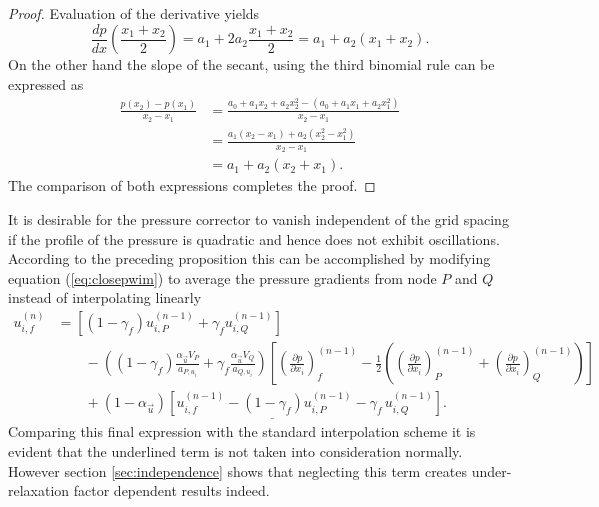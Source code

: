 \begin{proof}
  Evaluation of the derivative yields
  \begin{displaymath}
      \frac{dp}{dx}\left(\frac{x_1+x_2}{2}\right) = a_1 + 2 a_2 \frac{x_1 + x_2}{2} = a_1 + a_2(x_1 + x_2).
  \end{displaymath}
  On the other hand the slope of the secant, using the third binomial rule can be expressed as
  \begin{displaymath}
    \begin{array}{ll}
    \frac{p(x_2) - p(x_1)}{x_2 - x_1} 
  &= \frac{a_0 + a_1 x_2 + a_2 x_2^2 - \left(a_0 + a_1 x_1 + a_2 x_1 ^2\right)}{x_2 - x_1} \\[1.0em]
    \quad &= \frac{a_1 (x_2 - x_1) + a_2 \left(x_2^2 - x_1^2\right)}{x_2 - x_1} \\[1.0em]
    \quad &= a_1 + a_2 (x_2 + x_1).
  \end{array}
  \end{displaymath}
  The comparison of both expressions completes the proof.
\end{proof}
  It is desirable for the pressure corrector to vanish independent of the grid spacing if the profile of the pressure is quadratic and hence does not exhibit oscillations. According to the preceding proposition this can be accomplished by modifying equation (\ref{eq:closepwim}) to average the pressure gradients from node \(P\) and \(Q\) instead of interpolating linearly
  \begin{align}
    u_{i,f}^{(n)} 
    &=
    \left[\left(1 - \gamma_f\right) u_{i,P}^{(n-1)} + \gamma_f u_{i,Q}^{(n-1)} \right] \nonumber\\[1em]
    &\quad\quad - 
    \left(\left(1 - \gamma_f\right) \frac{\alpha_\vec{u} V_P}{a_{P,u_i}} + \gamma_f \frac{\alpha_\vec{u} V_Q}{a_{Q,u_i}}\right)
    \left[ 
    \left(\frac{\partial p}{\partial x_i}\right)_f^{(n-1)} 
    - \frac{1}{2} \left( \left( \frac{\partial p}{\partial x_i} \right)_P^{(n-1)} 
    + \left(\frac{\partial p}{\partial x_i}\right)_Q^{(n-1)} \right)
    \right] \nonumber \\[1em]
    &\quad\quad + \underline{\left(1 - \alpha_\vec{u}\right) \left[ u_{i,f}^{(n-1)} - \left(1 - \gamma_f\right) u_{i,P}^{(n-1)} - \gamma_f \, u_{i,Q}^{(n-1)} \right]}.
  \end{align}
  Comparing this final expression with the standard interpolation scheme it is evident that the underlined term is not taken into consideration \cite{ferziger02} normally. However section \ref{sec:independence} shows that neglecting this term creates under-relaxation factor dependent results indeed.

